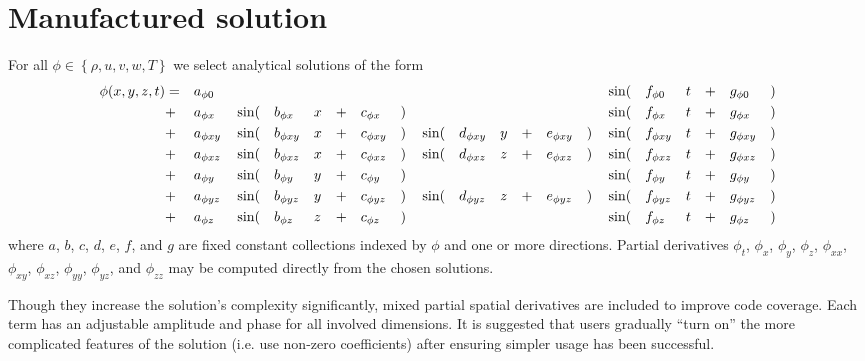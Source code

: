\documentclass[10pt,reqno]{amsart}
\begin{document}
\section{Manufactured solution}

For all $\phi\in\left\{\rho, u, v, w, T\right\}$ we select analytical solutions
of the form
\begin{alignat}{20}
\label{eq:solution}
  \phi\!\left(x, y, z, t\right)
&= &&a_{\phi{}0}  &&     &&             &&  &&  &&            &&  &&     &&             &&  &&  &&            &&   &&\sin(&&f_{\phi{}0 } &&t &&+ &&g_{\phi{}0 }&&)       \\
&+ &&a_{\phi{}x } &&\sin(&&b_{\phi{}x } &&x &&+ &&c_{\phi{}x }&&) &&     &&             &&  &&  &&            &&   &&\sin(&&f_{\phi{}x } &&t &&+ &&g_{\phi{}x }&&) \notag\\
&+ &&a_{\phi{}xy} &&\sin(&&b_{\phi{}xy} &&x &&+ &&c_{\phi{}xy}&&) &&\sin(&&d_{\phi{}xy} &&y &&+ &&e_{\phi{}xy}&&)  &&\sin(&&f_{\phi{}xy} &&t &&+ &&g_{\phi{}xy}&&) \notag\\
&+ &&a_{\phi{}xz} &&\sin(&&b_{\phi{}xz} &&x &&+ &&c_{\phi{}xz}&&) &&\sin(&&d_{\phi{}xz} &&z &&+ &&e_{\phi{}xz}&&)  &&\sin(&&f_{\phi{}xz} &&t &&+ &&g_{\phi{}xz}&&) \notag\\
&+ &&a_{\phi{}y } &&\sin(&&b_{\phi{}y } &&y &&+ &&c_{\phi{}y }&&) &&     &&             &&  &&  &&            &&   &&\sin(&&f_{\phi{}y } &&t &&+ &&g_{\phi{}y }&&) \notag\\
&+ &&a_{\phi{}yz} &&\sin(&&b_{\phi{}yz} &&y &&+ &&c_{\phi{}yz}&&) &&\sin(&&d_{\phi{}yz} &&z &&+ &&e_{\phi{}yz}&&)  &&\sin(&&f_{\phi{}yz} &&t &&+ &&g_{\phi{}yz}&&) \notag\\
&+ &&a_{\phi{}z } &&\sin(&&b_{\phi{}z } &&z &&+ &&c_{\phi{}z }&&) &&     &&             &&  &&  &&            &&   &&\sin(&&f_{\phi{}z } &&t &&+ &&g_{\phi{}z }&&) \notag
\end{alignat}
where $a$, $b$, $c$, $d$, $e$, $f$, and $g$ are fixed constant collections
indexed by $\phi$ and one or more directions.  Partial derivatives $\phi_{t }$,
$\phi_{x }$, $\phi_{y }$, $\phi_{z }$, $\phi_{xx}$, $\phi_{xy}$, $\phi_{xz}$,
$\phi_{yy}$, $\phi_{yz}$, and $\phi_{zz}$ may be computed directly from the
chosen solutions.

Though they increase the solution's complexity significantly, mixed partial
spatial derivatives are included to improve code coverage.  Each term has an
adjustable amplitude and phase for all involved dimensions.  It is suggested
that users gradually ``turn on'' the more complicated features of the solution
(i.e. use non-zero coefficients) after ensuring simpler usage has been
successful.
\end{document}
